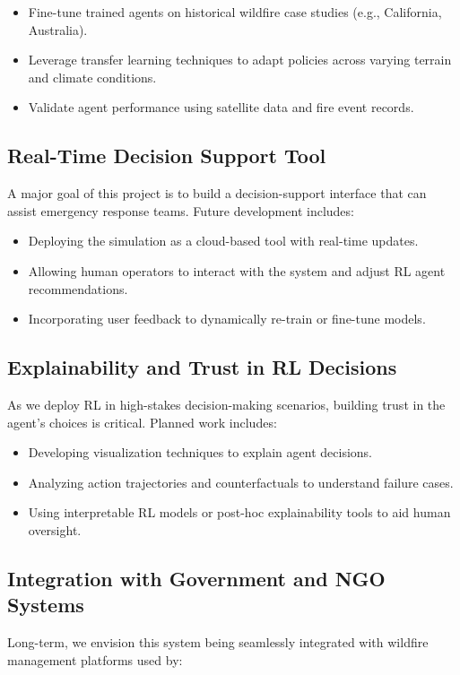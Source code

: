\documentclass[conference]{IEEEtran}
\begin{document}
\begin{itemize}
\item Fine-tune trained agents on historical wildfire case studies (e.g., California, Australia).
\item Leverage transfer learning techniques to adapt policies across varying terrain and climate conditions.
\item Validate agent performance using satellite data and fire event records.
\end{itemize}

\subsection{Real-Time Decision Support Tool}
A major goal of this project is to build a decision-support interface that can assist emergency response teams. Future development includes:

\begin{itemize}
\item Deploying the simulation as a cloud-based tool with real-time updates.
\item Allowing human operators to interact with the system and adjust RL agent recommendations.
\item Incorporating user feedback to dynamically re-train or fine-tune models.
\end{itemize}

\subsection{Explainability and Trust in RL Decisions}
As we deploy RL in high-stakes decision-making scenarios, building trust in the agent's choices is critical. Planned work includes:

\begin{itemize}
\item Developing visualization techniques to explain agent decisions.
\item Analyzing action trajectories and counterfactuals to understand failure cases.
\item Using interpretable RL models or post-hoc explainability tools to aid human oversight.
\end{itemize}

\subsection{Integration with Government and NGO Systems}
Long-term, we envision this system being seamlessly integrated with wildfire management platforms used by:
\end{document}

